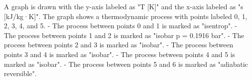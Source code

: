 A graph is drawn with the y-axis labeled as "T [K]" and the x-axis labeled as "s [kJ/kg·K]". The graph shows a thermodynamic process with points labeled 0, 1, 2, 3, 4, and 5.  
- The process between points 0 and 1 is marked as "isentrop".  
- The process between points 1 and 2 is marked as "isobar p = 0.1916 bar".  
- The process between points 2 and 3 is marked as "isobar".  
- The process between points 3 and 4 is marked as "isobar".  
- The process between points 4 and 5 is marked as "isobar".  
- The process between points 5 and 6 is marked as "adiabatic reversible".